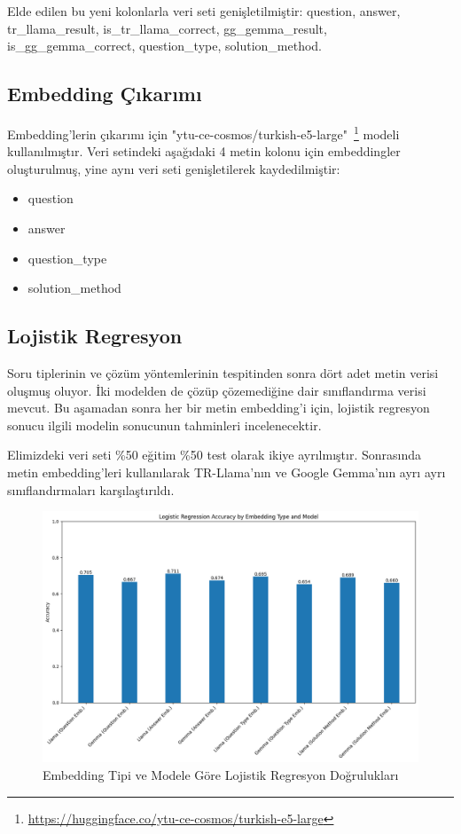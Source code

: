 \documentclass[conference]{IEEEtran}
\begin{document}
Elde edilen bu yeni kolonlarla veri seti genişletilmiştir: question, answer, tr\_llama\_result, is\_tr\_llama\_correct, gg\_gemma\_result, is\_gg\_gemma\_correct, question\_type, solution\_method.

\subsection{Embedding Çıkarımı}
Embedding'lerin çıkarımı için "ytu-ce-cosmos/turkish-e5-large"~\footnote{\url{https://huggingface.co/ytu-ce-cosmos/turkish-e5-large}} modeli kullanılmıştır. Veri setindeki aşağıdaki 4 metin kolonu için embeddingler oluşturulmuş, yine aynı veri seti genişletilerek kaydedilmiştir:

\begin{itemize}
\item question
\item answer
\item question\_type
\item solution\_method
\end{itemize}

\subsection{Lojistik Regresyon}
Soru tiplerinin ve çözüm yöntemlerinin tespitinden sonra dört adet metin verisi oluşmuş oluyor. İki modelden de çözüp çözemediğine dair sınıflandırma verisi mevcut. Bu aşamadan sonra her bir metin embedding'i için, lojistik regresyon sonucu ilgili modelin sonucunun tahminleri incelenecektir.

Elimizdeki veri seti \%50 eğitim \%50 test olarak ikiye ayrılmıştır. Sonrasında metin embedding'leri kullanılarak TR-Llama'nın ve Google Gemma'nın ayrı ayrı sınıflandırmaları karşılaştırıldı.

\begin{figure}[htbp]
\centering
\includegraphics[width=1\linewidth]{accuracy.png}
\caption{Embedding Tipi ve Modele Göre Lojistik Regresyon Doğrulukları}
\label{fig}
\end{figure}
\end{document}

